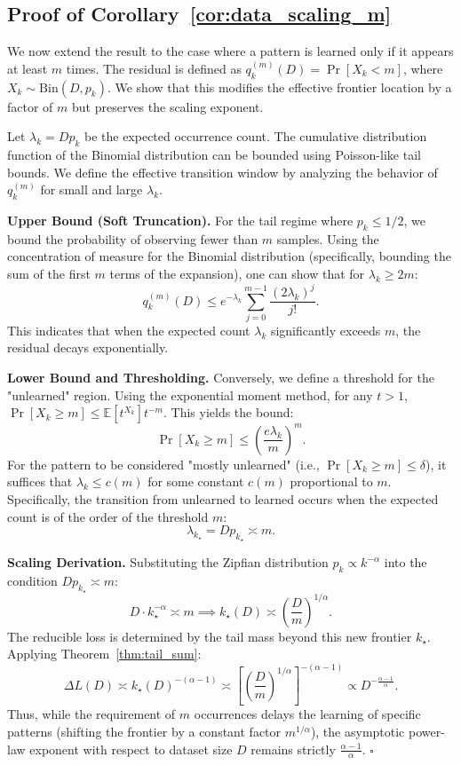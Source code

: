 \documentclass{article}
\theoremstyle{plain}
\theoremstyle{definition}
\theoremstyle{remark}
\begin{document}
\subsection{Proof of Corollary~\ref{cor:data_scaling_m}}
\label{app:proof_cor_m}

We now extend the result to the case where a pattern is learned only if it appears at least $m$ times. The residual is defined as $q_k^{(m)}(D) = \Pr[X_k < m]$, where $X_k \sim \mathrm{Bin}(D, p_k)$. We show that this modifies the effective frontier location by a factor of $m$ but preserves the scaling exponent.

Let $\lambda_k = D p_k$ be the expected occurrence count. The cumulative distribution function of the Binomial distribution can be bounded using Poisson-like tail bounds.
We define the effective transition window by analyzing the behavior of $q_k^{(m)}$ for small and large $\lambda_k$.

\textbf{Upper Bound (Soft Truncation).}
For the tail regime where $p_k \le 1/2$, we bound the probability of observing fewer than $m$ samples. Using the concentration of measure for the Binomial distribution (specifically, bounding the sum of the first $m$ terms of the expansion), one can show that for $\lambda_k \ge 2m$:
\begin{equation*}
    q_k^{(m)}(D) \le e^{-\lambda_k} \sum_{j=0}^{m-1} \frac{(2\lambda_k)^j}{j!}.
\end{equation*}
This indicates that when the expected count $\lambda_k$ significantly exceeds $m$, the residual decays exponentially.

\textbf{Lower Bound and Thresholding.}
Conversely, we define a threshold for the "unlearned" region. Using the exponential moment method, for any $t>1$, $\Pr[X_k \ge m] \le \mathbb{E}[t^{X_k}] t^{-m}$. This yields the bound:
\[
\Pr[X_k \ge m] \le \left( \frac{e \lambda_k}{m} \right)^m.
\]
For the pattern to be considered "mostly unlearned" (i.e., $\Pr[X_k \ge m] \le \delta$), it suffices that $\lambda_k \le c(m)$ for some constant $c(m)$ proportional to $m$. Specifically, the transition from unlearned to learned occurs when the expected count is of the order of the threshold $m$:
\[
\lambda_{k_\star} = D p_{k_\star} \asymp m.
\]

\textbf{Scaling Derivation.}
Substituting the Zipfian distribution $p_k \propto k^{-\alpha}$ into the condition $D p_{k_\star} \asymp m$:
\[
D \cdot k_\star^{-\alpha} \asymp m \implies k_\star(D) \asymp \left( \frac{D}{m} \right)^{1/\alpha}.
\]
The reducible loss is determined by the tail mass beyond this new frontier $k_\star$. Applying Theorem~\ref{thm:tail_sum}:
\[
\Delta L(D) \asymp k_\star(D)^{-(\alpha-1)} \asymp \left[ \left(\frac{D}{m}\right)^{1/\alpha} \right]^{-(\alpha-1)} \propto D^{-\frac{\alpha-1}{\alpha}}.
\]
Thus, while the requirement of $m$ occurrences delays the learning of specific patterns (shifting the frontier by a constant factor $m^{1/\alpha}$), the asymptotic power-law exponent with respect to dataset size $D$ remains strictly $\frac{\alpha-1}{\alpha}$. \hfill $\square$
\end{document}
